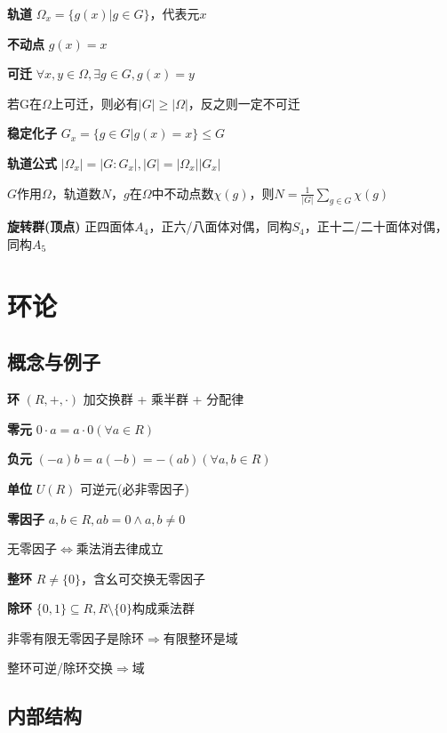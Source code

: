 \documentclass[b4paper, 10pt]{ctexart}
\newcommand*{\impl}{\Rightarrow}
\renewcommand*{\iff}{\Leftrightarrow}
\renewcommand*{\leq}{\leqslant}
\renewcommand*{\geq}{\geqslant}
\begin{document}
\begin{multicols}{3}
    \textbf{轨道} $\Omega_x = \{ g(x) | g \in G \}$，代表元$x$

    \textbf{不动点} $g(x) = x$

    \textbf{可迁} $\forall x, y \in \Omega, \exists g \in G, g(x) = y$

    若G在$\Omega$上可迁，则必有$|G|\geq |\Omega|$，反之则一定不可迁

    \textbf{稳定化子} $G_x \! = \! \{ g \!\in\! G | g(x) \! = \! x \} \!\leq\! G$

    \textbf{轨道公式} $|\Omega_x| = |G : G_x|, |G| = |\Omega_x||G_x|$

    \begin{theorem}[Burnside 引理]
        $G$作用$\Omega$，轨道数$N$，$g$在$\Omega$中不动点数$\chi(g)$，则$N = \frac{1}{|G|} \sum\limits_{g \in G} \chi(g)$
    \end{theorem}

    \textbf{旋转群(顶点)} 正四面体$A_4$，正六/八面体对偶，同构$S_4$，正十二/二十面体对偶，同构$A_5$

    \section{环论}

    \subsection{概念与例子}

    \textbf{环} $(R, +, \cdot)$ 加交换群 + 乘半群 + 分配律

    \textbf{零元} $0 \cdot a = a \cdot 0 (\forall a \in R)$

    \textbf{负元} $(-a)b = a(-b) = -(ab) (\forall a, b \in R)$

    \textbf{单位} $U(R)$ 可逆元(必非零因子)

    \textbf{零因子} $a, b \in R, ab = 0 \wedge a, b \ne 0$

    无零因子$\iff$乘法消去律成立

    \textbf{整环} $R\ne \{0\}$，含幺可交换无零因子

    \textbf{除环} $\{0, 1\} \subseteq R, R \setminus \{0\}$构成乘法群

    非零有限无零因子是除环$\!\impl\!$有限整环是域

    整环可逆/除环交换$\impl$域

    \subsection{内部结构}


\end{multicols}
\end{document}
